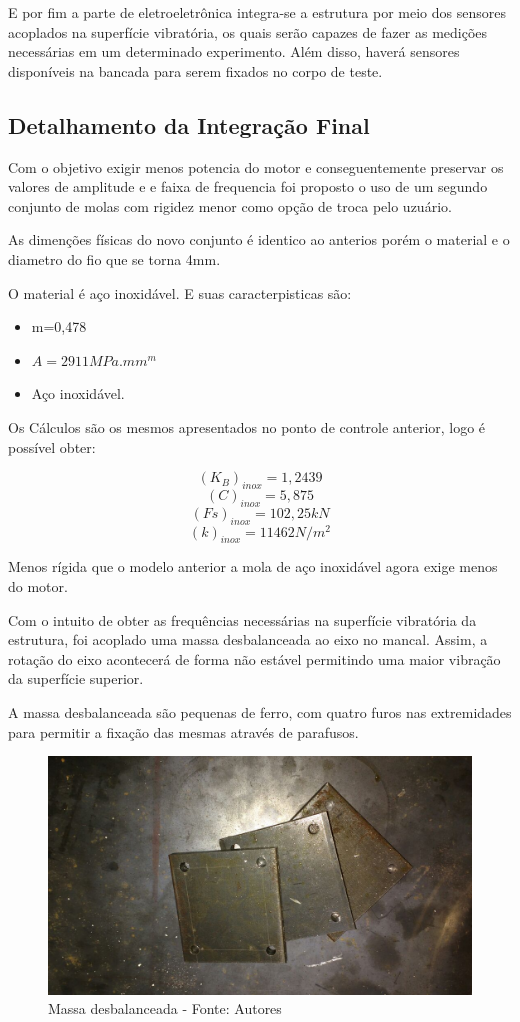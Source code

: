   E por fim a parte de eletroeletrônica integra-se a estrutura por meio dos sensores acoplados na superfície vibratória, os quais serão capazes de fazer as medições necessárias em um determinado experimento. Além disso, haverá sensores disponíveis na bancada para serem fixados no corpo de teste.

\subsection{Detalhamento da Integração Final}

Com o objetivo exigir menos potencia do motor e conseguentemente preservar os valores de amplitude e e faixa de frequencia foi proposto o uso de um segundo conjunto de molas com rigidez menor como opção de troca pelo uzuário.

As dimenções físicas do novo conjunto é identico ao anterios porém o material e o diametro do fio que se torna 4mm.

O material é aço inoxidável. E suas caracterpisticas são:

\begin{itemize}
\item m=0,478
\item $A=2911 MPa.mm^m$
\item Aço inoxidável.
\end{itemize}

Os Cálculos são os mesmos apresentados no ponto de controle anterior, logo é possível obter:

$$(K_B)_{inox}=1,2439$$
$$(C)_{inox}=5,875 $$
$$(Fs)_{inox}=102,25kN $$
$$(k)_{inox}=11462 N/m^2$$

Menos rígida que o modelo anterior a mola de aço inoxidável agora exige menos do motor.

Com o intuito de obter as frequências necessárias na superfície vibratória da estrutura, foi acoplado uma massa desbalanceada ao eixo no mancal. Assim, a rotação do eixo acontecerá de forma não estável permitindo uma maior vibração da superfície superior.

A massa desbalanceada são pequenas de ferro, com quatro furos nas extremidades para permitir a fixação das mesmas através de parafusos.

  \begin{figure}[H]
      \centering
      \includegraphics[scale=0.3]{figuras/massa_desbalanceada.jpeg}
      \caption{Massa desbalanceada - Fonte: Autores}
      \label{fig:massa_desbalanceada}
  \end{figure}

